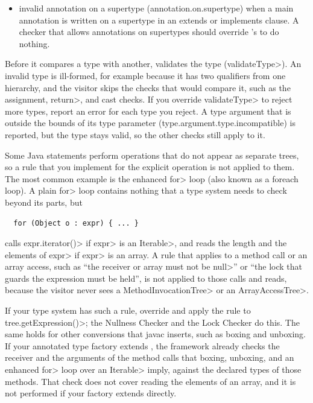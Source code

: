 \begin{itemize}
\item invalid annotation on a supertype (annotation.on.supertype)
  when a main annotation is written on a supertype in an extends or
  implements clause. A checker that allows annotations on supertypes
  should override 's
   to do nothing.


\end{itemize}

Before it compares a type with another, 
validates the type (\<validateType>).  An invalid type is ill-formed, for
example because it has two qualifiers from one hierarchy, and the
visitor skips the checks that would compare it, such as the assignment,
\<return>, and cast checks.  If you override \<validateType> to reject
more types, report an error for each type you reject.  A type argument
that is outside the bounds of its type parameter
(type.argument.type.incompatible) is reported, but the type stays valid,
so the other checks still apply to it.



Some Java statements perform operations that do not appear as separate
trees, so a rule that you implement for the explicit operation is not
applied to them.  The most common example is the enhanced \<for> loop
(also known as a foreach loop).  A plain \<for> loop contains nothing that
a type system needs to check beyond its parts, but
\begin{Verbatim}
  for (Object o : expr) { ... }
\end{Verbatim}
calls \<expr.iterator()> if \<expr> is an \<Iterable>, and reads
the length and the elements of \<expr> if \<expr> is an array.
A rule that applies to a method call or an array access, such as
``the receiver or array must not be \<null>'' or ``the lock that guards the
expression must be held'', is not applied to those calls and reads, because
the visitor never sees a \<MethodInvocationTree> or an
\<ArrayAccessTree>.

If your type system has such a rule, override
and apply the rule to \<tree.getExpression()>;
the Nullness Checker and the Lock Checker do this.
The same holds for other conversions that javac inserts, such as boxing and
unboxing.  If your annotated type factory extends
, the framework already
checks the receiver and the arguments of the method calls that boxing,
unboxing, and an enhanced \<for> loop over an \<Iterable> imply, against the
declared types of those methods.  That check does not cover reading the
elements of an array, and it is not performed if your factory extends
 directly.

